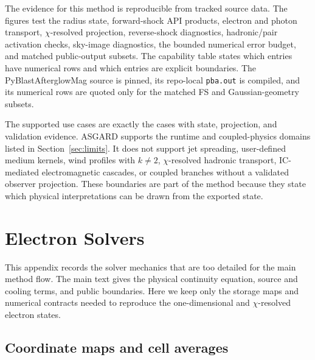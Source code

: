 \documentclass[twocolumn]{aastex702}
\begin{document}
The evidence for this method is reproducible from tracked source data.  The
figures test the radius state, forward-shock API products, electron and photon
transport, \(\chi\)-resolved projection, reverse-shock diagnostics,
hadronic/pair activation checks, sky-image diagnostics, the bounded numerical
error budget, and matched public-output subsets.  The capability table
states which entries have numerical rows and which entries are explicit
boundaries.  The PyBlastAfterglowMag source is pinned, its repo-local
\texttt{pba.out} is compiled, and its numerical rows are quoted only for the
matched FS and Gaussian-geometry subsets.

The supported use cases are exactly the cases with state, projection, and
validation evidence.  ASGARD supports the runtime and coupled-physics domains
listed in Section~\ref{sec:limits}.  It does not support jet spreading,
user-defined medium kernels, wind profiles with \(k\ne2\), \(\chi\)-resolved
hadronic transport, IC-mediated electromagnetic cascades, or coupled branches
without a validated observer projection.  These boundaries are part of the
method because they state which physical interpretations can be drawn from the
exported state.

\appendix
\setcounter{figure}{0}
\renewcommand{\thefigure}{A\arabic{figure}}
\renewcommand{\theHfigure}{A\arabic{figure}}


\section{Electron Solvers} \label{app:electron-solvers}

This appendix records the solver mechanics that are too detailed for the main
method flow.  The main text gives the physical continuity equation, source and
cooling terms, and public boundaries.  Here we keep only the storage maps and
numerical contracts needed to reproduce the one-dimensional and \(\chi\)-resolved
electron states.

\subsection{Coordinate maps and cell averages}
\end{document}
